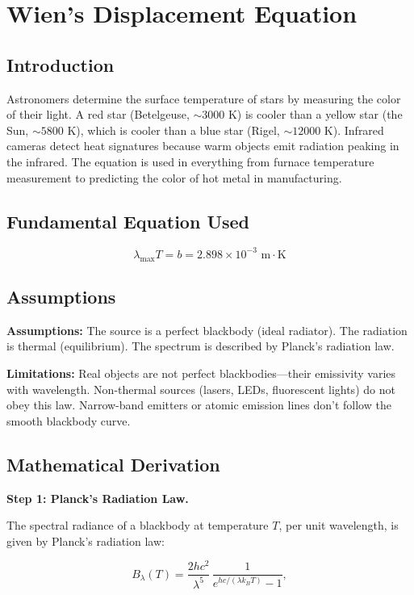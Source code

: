 \chapter{Wien's Displacement Equation}

\section*{Introduction}

Astronomers determine the surface temperature of stars by measuring the color of their light. A red star (Betelgeuse, $\sim 3000$ K) is cooler than a yellow star (the Sun, $\sim 5800$ K), which is cooler than a blue star (Rigel, $\sim 12000$ K). Infrared cameras detect heat signatures because warm objects emit radiation peaking in the infrared. The equation is used in everything from furnace temperature measurement to predicting the color of hot metal in manufacturing.

\section*{Fundamental Equation Used}

\[
\lambda_{\max} T = b = 2.898 \times 10^{-3} \text{ m}\cdot\text{K}
\]
\section*{Assumptions}

\textbf{Assumptions:} The source is a perfect blackbody (ideal radiator). The radiation is thermal (equilibrium). The spectrum is described by Planck's radiation law.


\textbf{Limitations:} Real objects are not perfect blackbodies---their emissivity varies with wavelength. Non-thermal sources (lasers, LEDs, fluorescent lights) do not obey this law. Narrow-band emitters or atomic emission lines don't follow the smooth blackbody curve.


\section*{Mathematical Derivation}

\textbf{Step 1: Planck's Radiation Law.}

The spectral radiance of a blackbody at temperature $T$, per unit wavelength, is given by Planck's radiation law:

\begin{equation}
B_\lambda(T) = \frac{2hc^2}{\lambda^5}\,\frac{1}{e^{hc/(\lambda k_B T)} - 1},
\end{equation}

